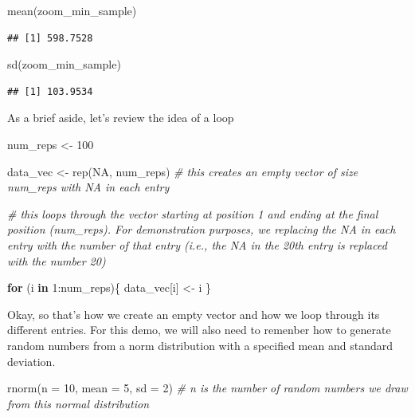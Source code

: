 \documentclass[
]{book}
\newenvironment{Shaded}{\begin{snugshade}}{\end{snugshade}}
\newcommand{\AttributeTok}[1]{\textcolor[rgb]{0.77,0.63,0.00}{#1}}
\newcommand{\CommentTok}[1]{\textcolor[rgb]{0.56,0.35,0.01}{\textit{#1}}}
\newcommand{\ConstantTok}[1]{\textcolor[rgb]{0.00,0.00,0.00}{#1}}
\newcommand{\ControlFlowTok}[1]{\textcolor[rgb]{0.13,0.29,0.53}{\textbf{#1}}}
\newcommand{\DecValTok}[1]{\textcolor[rgb]{0.00,0.00,0.81}{#1}}
\newcommand{\FunctionTok}[1]{\textcolor[rgb]{0.00,0.00,0.00}{#1}}
\newcommand{\NormalTok}[1]{#1}
\newcommand{\OtherTok}[1]{\textcolor[rgb]{0.56,0.35,0.01}{#1}}
\newcommand{\SpecialCharTok}[1]{\textcolor[rgb]{0.00,0.00,0.00}{#1}}
\begin{document}
\begin{Shaded}
\begin{Highlighting}[]
\FunctionTok{mean}\NormalTok{(zoom\_min\_sample)}
\end{Highlighting}
\end{Shaded}

\begin{verbatim}
## [1] 598.7528
\end{verbatim}

\begin{Shaded}
\begin{Highlighting}[]
\FunctionTok{sd}\NormalTok{(zoom\_min\_sample)}
\end{Highlighting}
\end{Shaded}

\begin{verbatim}
## [1] 103.9534
\end{verbatim}

As a brief aside, let's review the idea of a loop

\begin{Shaded}
\begin{Highlighting}[]
\NormalTok{num\_reps }\OtherTok{\textless{}{-}} \DecValTok{100}

\NormalTok{data\_vec }\OtherTok{\textless{}{-}} \FunctionTok{rep}\NormalTok{(}\ConstantTok{NA}\NormalTok{, num\_reps) }\CommentTok{\# this creates an empty vector of size num\_reps with NA in each entry}

\CommentTok{\# this loops through the vector starting at position 1 and ending at the final position (num\_reps). For demonstration purposes, we replacing the NA in each entry with the number of that entry (i.e., the NA in the 20th entry is replaced with the number 20)}

\ControlFlowTok{for}\NormalTok{ (i }\ControlFlowTok{in} \DecValTok{1}\SpecialCharTok{:}\NormalTok{num\_reps)\{}
\NormalTok{  data\_vec[i] }\OtherTok{\textless{}{-}}\NormalTok{ i}
\NormalTok{\}}
\end{Highlighting}
\end{Shaded}

Okay, so that's how we create an empty vector and how we loop through its different entries. For this demo, we will also need to remenber how to generate random numbers from a norm distribution with a specified mean and standard deviation.

\begin{Shaded}
\begin{Highlighting}[]
\FunctionTok{rnorm}\NormalTok{(}\AttributeTok{n =} \DecValTok{10}\NormalTok{, }\AttributeTok{mean =} \DecValTok{5}\NormalTok{, }\AttributeTok{sd =} \DecValTok{2}\NormalTok{) }\CommentTok{\# n is the number of random numbers we draw from this normal distribution}
\end{Highlighting}
\end{Shaded}
\end{document}

